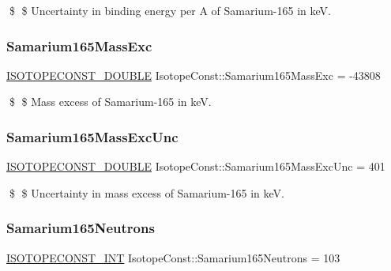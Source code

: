 \$ \$ Uncertainty in binding energy per A of Samarium-\/165 in keV. \mbox{\label{group___isotope_const-_samarium-_sm165_ga8c3fcd39b6f4840342743a3af3fdf3eb}} 
\subsubsection{\texorpdfstring{Samarium165\+Mass\+Exc}{Samarium165MassExc}}
{\footnotesize\ttfamily \mbox{\hyperlink{group___isotope_const-_macros_ga8f45a7272ce02c0b4c65c44636ed719a}{I\+S\+O\+T\+O\+P\+E\+C\+O\+N\+S\+T\+\_\+\+D\+O\+U\+B\+LE}} Isotope\+Const\+::\+Samarium165\+Mass\+Exc = -\/43808}

\$ \$ Mass excess of Samarium-\/165 in keV. \mbox{\label{group___isotope_const-_samarium-_sm165_ga966de0a334cc7612b5cf17aa6b1f110e}} 
\subsubsection{\texorpdfstring{Samarium165\+Mass\+Exc\+Unc}{Samarium165MassExcUnc}}
{\footnotesize\ttfamily \mbox{\hyperlink{group___isotope_const-_macros_ga8f45a7272ce02c0b4c65c44636ed719a}{I\+S\+O\+T\+O\+P\+E\+C\+O\+N\+S\+T\+\_\+\+D\+O\+U\+B\+LE}} Isotope\+Const\+::\+Samarium165\+Mass\+Exc\+Unc = 401}

\$ \$ Uncertainty in mass excess of Samarium-\/165 in keV. \mbox{\label{group___isotope_const-_samarium-_sm165_ga0e69184dbf4c051c1270ec7455664c93}} 
\subsubsection{\texorpdfstring{Samarium165\+Neutrons}{Samarium165Neutrons}}
{\footnotesize\ttfamily \mbox{\hyperlink{group___isotope_const-_macros_ga5f18360b3e99483a35c32d789e62621c}{I\+S\+O\+T\+O\+P\+E\+C\+O\+N\+S\+T\+\_\+\+I\+NT}} Isotope\+Const\+::\+Samarium165\+Neutrons = 103}

